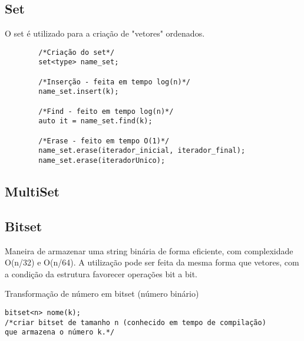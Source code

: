 \subsection{Set}    
    O set é utilizado para a criação de "vetores" ordenados.
    \begin{verbatim}
        /*Criação do set*/
        set<type> name_set; 

        /*Inserção - feita em tempo log(n)*/
        name_set.insert(k);

        /*Find - feito em tempo log(n)*/
        auto it = name_set.find(k);

        /*Erase - feito em tempo O(1)*/
        name_set.erase(iterador_inicial, iterador_final);
        name_set.erase(iteradorUnico);
    \end{verbatim}

\subsection{MultiSet} 

\subsection{Bitset}
    Maneira de armazenar uma string binária de forma eficiente, com complexidade O(n/32) e O(n/64). A utilização pode ser feita da mesma forma que vetores, com a condição da estrutura favorecer operações bit a bit.

    Transformação de número em bitset (número binário)
    \begin{verbatim}
bitset<n> nome(k); 
/*criar bitset de tamanho n (conhecido em tempo de compilação) 
que armazena o número k.*/
    \end{verbatim}

\pagebreak